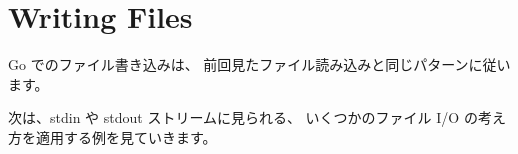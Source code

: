 \section{Writing Files}

Go でのファイル書き込みは、 前回見たファイル読み込みと同じパターンに従います。




次は、stdin や stdout ストリームに見られる、 いくつかのファイル I/O の考え方を適用する例を見ていきます。